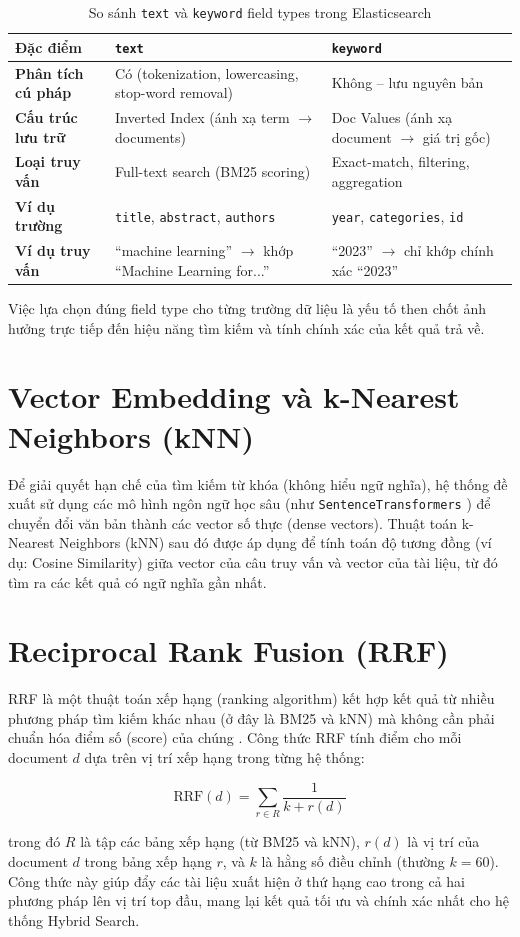 \begin{table}[H]
\centering
\begin{tabular}{|p{3cm}|p{5.5cm}|p{5.5cm}|}
\hline
\textbf{Đặc điểm} & \textbf{\texttt{text}} & \textbf{\texttt{keyword}} \\ \hline
\textbf{Phân tích cú pháp} & Có (tokenization, lowercasing, stop-word removal) & Không -- lưu nguyên bản \\ \hline
\textbf{Cấu trúc lưu trữ} & Inverted Index (ánh xạ term $\to$ documents) & Doc Values (ánh xạ document $\to$ giá trị gốc) \\ \hline
\textbf{Loại truy vấn} & Full-text search (BM25 scoring) & Exact-match, filtering, aggregation \\ \hline
\textbf{Ví dụ trường} & \texttt{title}, \texttt{abstract}, \texttt{authors} & \texttt{year}, \texttt{categories}, \texttt{id} \\ \hline
\textbf{Ví dụ truy vấn} & ``machine learning'' $\to$ khớp ``Machine Learning for...'' & ``2023'' $\to$ chỉ khớp chính xác ``2023'' \\ \hline
\end{tabular}
\caption{So sánh \texttt{text} và \texttt{keyword} field types trong Elasticsearch}
\label{tab:text-vs-keyword}
\end{table}

Việc lựa chọn đúng field type cho từng trường dữ liệu là yếu tố then chốt ảnh hưởng trực tiếp đến hiệu năng tìm kiếm và tính chính xác của kết quả trả về.

\section{Vector Embedding và k-Nearest Neighbors (kNN)}
Để giải quyết hạn chế của tìm kiếm từ khóa (không hiểu ngữ nghĩa), hệ thống đề xuất sử dụng các mô hình ngôn ngữ học sâu (như \texttt{SentenceTransformers} \cite{reimers2019sentencebert}) để chuyển đổi văn bản thành các vector số thực (dense vectors). Thuật toán k-Nearest Neighbors (kNN) sau đó được áp dụng để tính toán độ tương đồng (ví dụ: Cosine Similarity) giữa vector của câu truy vấn và vector của tài liệu, từ đó tìm ra các kết quả có ngữ nghĩa gần nhất.

\section{Reciprocal Rank Fusion (RRF)}
RRF là một thuật toán xếp hạng (ranking algorithm) kết hợp kết quả từ nhiều phương pháp tìm kiếm khác nhau (ở đây là BM25 và kNN) mà không cần phải chuẩn hóa điểm số (score) của chúng \cite{cormack2009rrf}. Công thức RRF tính điểm cho mỗi document $d$ dựa trên vị trí xếp hạng trong từng hệ thống:

\[
\text{RRF}(d) = \sum_{r \in R} \frac{1}{k + r(d)}
\]

trong đó $R$ là tập các bảng xếp hạng (từ BM25 và kNN), $r(d)$ là vị trí của document $d$ trong bảng xếp hạng $r$, và $k$ là hằng số điều chỉnh (thường $k = 60$). Công thức này giúp đẩy các tài liệu xuất hiện ở thứ hạng cao trong cả hai phương pháp lên vị trí top đầu, mang lại kết quả tối ưu và chính xác nhất cho hệ thống Hybrid Search.